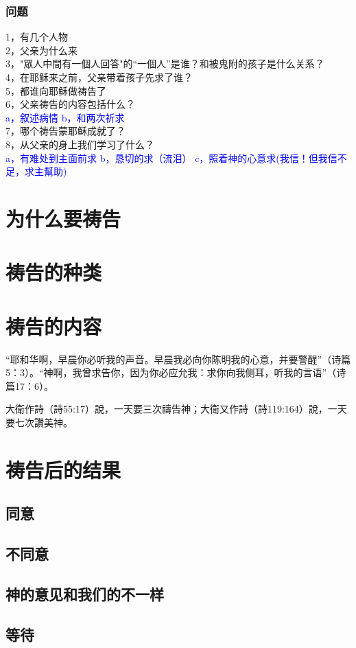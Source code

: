 \subsubsection{问题}
1，有几个人物\\
2，父亲为什么来\\
3，"眾人中間有一個人回答"的“一個人”是谁？和被鬼附的孩子是什么关系？\\
4，在耶稣来之前，父亲带着孩子先求了谁？\\
5，都谁向耶稣做祷告了\\
6，父亲祷告的内容包括什么？\\
\hspace{1cm}   \textcolor{blue}{a，叙述病情}
\hspace{1cm}   \textcolor{blue}{b，和两次祈求}\\
7，哪个祷告蒙耶稣成就了？\\
8，从父亲的身上我们学习了什么？\\
\hspace{1cm}    \textcolor{blue}{a，有难处到主面前求}
\hspace{1cm}    \textcolor{blue}{b，恳切的求（流泪）}
\hspace{1cm}    \textcolor{blue}{c，照着神的心意求(我信！但我信不足，求主幫助)}

\section{为什么要祷告}


\section{祷告的种类}
\section{祷告的内容}

“耶和华啊，早晨你必听我的声音。早晨我必向你陈明我的心意，并要警醒”（诗篇5：3）。“神啊，我曾求告你，因为你必应允我：求你向我侧耳，听我的言语”（诗篇17：6）。

大衛作詩（詩55:17）說，一天要三次禱告神；大衛又作詩（詩119:164）說，一天要七次讚美神。

\section{祷告后的结果}
\subsection{同意}
\subsection{不同意}
\subsection{神的意见和我们的不一样}
\subsection{等待}
